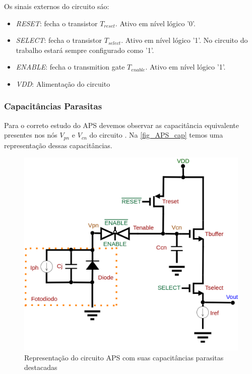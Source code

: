     Os sinais externos do circuito s\'ao:
    
\begin{itemize}
    \item \emph{RESET}: fecha o transistor \emph{$T_{reset}$}. Ativo em n\'ivel l\'ogico '0'.
     \item \emph{SELECT}: fecha o transistor \emph{$T_{select}$}. Ativo em n\'ivel l\'ogico '1'. No circuito do trabalho estar\'a sempre configurado como '1'.
     \item \emph{ENABLE}: fecha o transmition gate \emph{$T_{enable}$}. Ativo em n\'ivel l\'ogico '1'.
     \item \emph{VDD}: Alimenta{\c c}\~ao do circuito
\end{itemize}

\subsubsection{Capacit\^ancias Parasitas}
Para o correto estudo do APS devemos observar as capacit\^ancia equivalente presentes nos n\'os \emph{$V_{pn}$} e \emph{$V_{cn}$} do circuito \cite{LidianeCampos}. Na \autoref{fig_APS_cap} temos uma representa{\c c}\~ao dessas capacit\^ancias.

\begin{figure}[htb]
	\caption{\label{fig_APS_cap}Representa{\c c}\~ao do circuito APS com suas capacit\^ancias parasitas destacadas}
	\begin{center}
	    \includegraphics[scale=0.3]{Circuitos/APS_cap.png}
	\end{center}
\end{figure}

